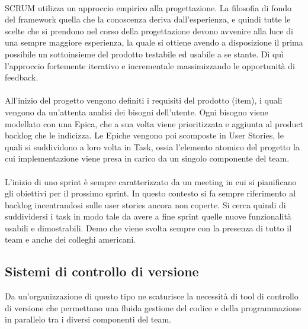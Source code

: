 \paragraph{}
SCRUM utilizza un approccio empirico alla progettazione. La filosofia di fondo del framework  quella che la conoscenza deriva dall'esperienza, e quindi tutte le scelte che si prendono nel corso della progettazione devono avvenire alla luce di una sempre maggiore esperienza, la quale si ottiene avendo a disposizione il prima possibile un sottoinsieme del prodotto testabile ed usabile a se stante. Dì quì l'approccio fortemente iterativo e incrementale massimizzando le opportunità di feedback. 
\paragraph{} 
All'inizio del progetto vengono definiti i requisiti del prodotto (item), i quali vengono da un'attenta analisi dei bisogni dell'utente. Ogni bisogno viene modellato con una Epica, che a sua volta viene prioritizzata e aggiunta al product backlog che le indicizza. Le Epiche vengono poi scomposte in User Stories, le quali si suddividono a loro volta in Task, ossia l'elemento atomico del progetto la cui implementazione viene presa in carico da un singolo componente del team.
\paragraph{}
L'inizio di uno sprint è sempre caratterizzato da un meeting in cui si pianificano gli obiettivi per il prossimo sprint. In questo contesto si fa sempre riferimento al backlog incentrandosi sulle user stories ancora non coperte. Si cerca quindi di suddividersi i task in modo tale da avere a fine sprint quelle nuove funzionalità usabili e dimostrabili. Demo che viene svolta sempre con la presenza di tutto il team e anche dei colleghi americani.
\subsection{Sistemi di controllo di versione}
Da un'organizzazione di questo tipo ne scaturisce la necessità di tool di controllo di versione che permettano una fluida gestione del codice e della programmazione in parallelo tra i diversi componenti del team.
